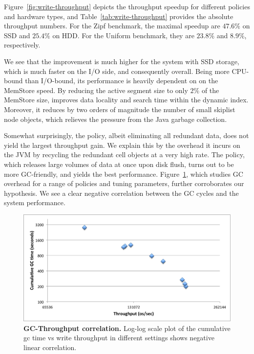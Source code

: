Figure~\ref{fig:write-throughput} depicts the throughput speedup for different policies and hardware types, 
and Table~\ref{tab:write-throughput} provides the absolute throughput numbers. For the Zipf benchmark, 
the maximal speedup are $47.6\%$ on SSD and $25.4\%$ on HDD. For the Uniform benchmark, they are 
$23.8\%$ and $8.9\%$, respectively. 

We see that the improvement is much higher for the system with SSD storage, which is much faster 
on the I/O side, and consequently overall. Being more CPU-bound than I/O-bound, its performance 
is heavily dependent on on the MemStore speed. By reducing the active segment size to only $2\%$
of the MemStore size, \sys\/ improves data locality and search time within the dynamic index. Moreover, 
it reduces by two orders of magnitude the number of small skiplist node objects, which relieves the 
pressure from the Java garbage collection. 

Somewhat surprisingly, the \eager\/ policy, albeit eliminating all redundant data, does not yield the largest 
throughput gain. We explain this by the overhead it incurs on the JVM by recycling the redundant cell 
objects at a very high rate. The \basic\/ policy, which releases large volumes of data at once upon disk 
flush, turns out to be more GC-friendly, and yields the best performance. Figure~\ref{fig:gc-throughput-log2}, 
which studies GC overhead for a range of policies and tuning parameters, further corroborates our 
hypothesis. We see a clear negative correlation between the GC cycles and the system performance. 

\begin{figure}[htb]
\includegraphics[width=\figw]{Figs/gc-throughput-log2.png}
\caption{{\bf GC-Throughput correlation.} Log-log scale plot of the cumulative gc time vs write throughput in different settings shows negative linear correlation.
}
\label{fig:gc-throughput-log2}
\end{figure}

